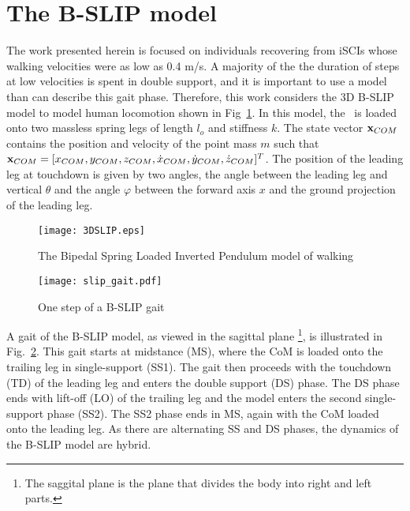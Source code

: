 \section{The B-SLIP model}
The work presented herein is focused on individuals recovering from iSCIs whose walking velocities were as low as 0.4 m/s. A majority of the the duration of steps at low velocities is spent in double support, and it is important to use a model than can describe this gait phase. Therefore, this work considers the 3D B-SLIP model to model human locomotion shown in Fig~\ref{fig:slip}. In this model, the \COM~is loaded onto two massless spring legs of length $ l_o $ and stiffness $ k $. The state vector $ \mathbf{x}_{COM} $ contains the position and velocity of the point mass $ m $ such that $ \mathbf{x}_{COM} = [x_{COM} ,y_{COM} ,z_{COM} ,\dot{x}_{COM} ,\dot{y}_{COM} ,\dot{z}_{COM}]^T $. The position of the leading leg at touchdown is given by two angles, the angle between the leading leg and vertical $ \theta $ and the angle $ \varphi $ between the forward axis $ x $  and the ground projection of the leading leg.
%
\begin{figure}
	\centering
	\texttt{[image: 3DSLIP.eps]}
	\caption{The Bipedal Spring Loaded Inverted Pendulum \cite{liu2015dynamic} model of walking}\label{fig:slip}
\end{figure}
%
\begin{figure}
	\centering
	\texttt{[image: slip\_gait.pdf]}
	\caption{One step of a B-SLIP gait}\label{fig:slip_gait}
\end{figure} 
%

A gait of the B-SLIP model, as viewed in the sagittal plane \footnote{The saggital plane is the plane that divides the body into right and left parts.}, is illustrated in Fig.~\ref{fig:slip_gait}. This gait starts at midstance (MS), where the CoM is loaded onto the trailing leg in single-support (SS1). The gait then proceeds with the touchdown (TD) of the leading leg and enters the double support (DS) phase. The DS phase ends with lift-off (LO) of the trailing leg and the model enters the second single-support phase (SS2). The SS2 phase ends in MS, again with the CoM loaded onto the leading leg. As there are alternating SS and DS phases, the dynamics of the B-SLIP model are hybrid.

